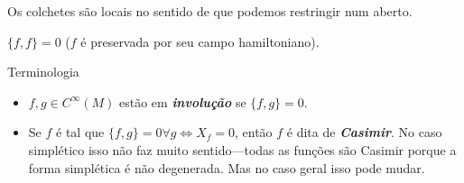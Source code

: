 \begin{remark}\leavevmode
Os colchetes  são locais no sentido de que podemos restringir num aberto.
\end{remark}
\begin{remark}\leavevmode
\(\{f,f\}=0\) (\(f\) é preservada por seu campo hamiltoniano).
\end{remark}
\begin{thing6}{Terminologia}\leavevmode
\begin{itemize}
\item \(f,g \in C^\infty(M)\) estão em  \textit{\textbf{involução}} se \(\{f,g\}=0\).
\item Se \(f\) é tal que \(\{f,g\}=0 \forall g \iff X_f=0\), então \(f\) é dita de \textit{\textbf{Casimir}}. No caso simplético isso não faz muito sentido---todas as funções são Casimir porque a forma simplética é não degenerada. Mas no caso geral isso pode mudar.
\end{itemize}
\end{thing6}

